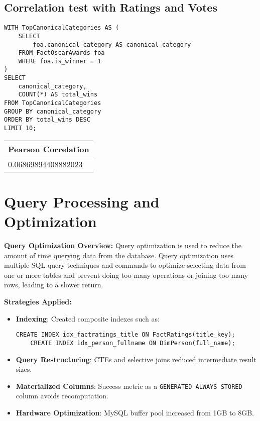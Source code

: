 \documentclass[sigconf, pbalance]{acmart}
\begin{document}
\subsection{Correlation test with Ratings and Votes}

\begin{lstlisting}[style=SQLStyle]
WITH TopCanonicalCategories AS (
    SELECT
        foa.canonical_category AS canonical_category
    FROM FactOscarAwards foa
    WHERE foa.is_winner = 1
)
SELECT
    canonical_category,
    COUNT(*) AS total_wins
FROM TopCanonicalCategories
GROUP BY canonical_category
ORDER BY total_wins DESC
LIMIT 10;
\end{lstlisting}
\begin{center}
\begin{tabular}{|p{8cm}|}
\hline
Pearson Correlation \\
\hline
0.06869894408882023 \\
\hline
\end{tabular}
\end{center}




\section{Query Processing and Optimization}

\textbf{Query Optimization Overview:}  
Query optimization is used to reduce the amount of time querying data from the database. Query optimization uses multiple SQL query techniques and commands to optimize selecting data from one or more tables and prevent doing too many operations or joining too many rows, leading to a slower return. 

\textbf{Strategies Applied:}
\begin{itemize}
    \item \textbf{Indexing}: Created composite indexes such as:
    \begin{lstlisting}[style=SQLStyle]
    CREATE INDEX idx_factratings_title ON FactRatings(title_key);
    CREATE INDEX idx_person_fullname ON DimPerson(full_name);
    \end{lstlisting}
    \item \textbf{Query Restructuring}: CTEs and selective joins reduced intermediate result sizes.
    \item \textbf{Materialized Columns}: Success metric as a \texttt{GENERATED ALWAYS STORED} column avoids recomputation.
    \item \textbf{Hardware Optimization}: MySQL buffer pool increased from 1GB to 8GB.
\end{itemize}
\end{document}
